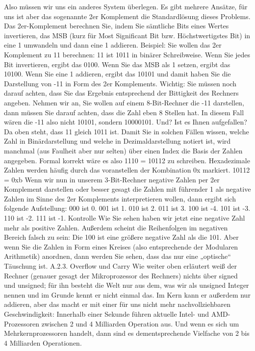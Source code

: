 Also müssen wir uns ein anderes System überlegen. Es gibt mehrere Ansätze, für uns ist aber das sogenannte 2er Komplement die Standardlösung dieses Problems. Das 2er-Komplement berechnen Sie, indem Sie sämtliche Bits eines Wertes invertieren, das MSB (kurz für Most Significant Bit bzw. Höchstwertigstes Bit) in eine 1 umwandeln und dann eine 1 addieren.
Beispiel: Sie wollen das 2er Komplement zu 11 berechnen:
11 ist 1011 in binärer Schreibweise.
Wenn Sie jedes Bit invertieren, ergibt das 0100.
Wenn Sie das MSB als 1 setzen, ergibt das 10100.
Wenn Sie eine 1 addieren, ergibt das 10101 und damit haben Sie die Darstellung von -11 in Form des 2er Komplements.
Wichtig: Sie müssen noch darauf achten, dass Sie das Ergebnis entsprechend der Bittigkeit des Rechners angeben. Nehmen wir an, Sie wollen auf einem 8-Bit-Rechner die -11 darstellen, dann müssen Sie darauf achten, dass die Zahl eben 8 Stellen hat. In diesem Fall wären die -11 also nicht 10101, sondern 10000101.
Und? Ist es Ihnen aufgefallen? Da oben steht, dass 11 gleich 1011 ist. Damit Sie in solchen Fällen wissen, welche Zahl in Binärdarstellung und welche in Dezimaldarstellung notiert ist, wird manchmal (aus Faulheit aber nur selten) über einen Index die Basis der Zahlen angegeben. Formal korrekt wäre es also 1110 = 10112 zu schreiben.
Hexadezimale Zahlen werden häufig durch das voranstellen der Kombination 0x markiert. 10112 = 0xb
Wenn wir nun in unserem 3-Bit-Rechner negative Zahlen per 2er Komplement darstellen oder besser gesagt die Zahlen mit führender 1 als negative Zahlen im Sinne des 2er Komplements interpretieren wollen, dann ergibt sich folgende Aufstellung:
000	ist 0.
001	ist 1.
010	ist 2.
011	ist 3.
100	ist -4.
101	ist -3.
110	ist -2.
111	ist -1.
Kontrolle
Wie Sie sehen haben wir jetzt eine negative Zahl mehr als positive Zahlen.
Außerdem scheint die Reihenfolgen im negativen Bereich falsch zu sein: Die 100 ist eine größere negative Zahl als die 101. Aber wenn Sie die Zahlen in Form eines Kreises (also entsprechende der Modularen Arithmetik) anordnen, dann werden Sie sehen, dass das nur eine „optische“ Täuschung ist.
A.2.3. Overflow und Carry
Wie weiter oben erläutert weiß der Rechner (genauer gesagt der Mikroprozessor des Rechners) nichts über signed und unsigned; für ihn besteht die Welt nur aus dem, was wir als unsigned Integer nennen und im Grunde kennt er nicht einmal das. Im Kern kann er außerdem nur addieren, aber das macht er mit einer für uns nicht mehr nachvollziehbaren Geschwindigkeit: Innerhalb einer Sekunde führen aktuelle Intel- und AMD-Prozessoren zwischen 2 und 4 Milliarden Operation aus. Und wenn es sich um Mehrkernprozessoren handelt, dann sind es dementsprechende Vielfache von 2 bis 4 Milliarden Operationen.
